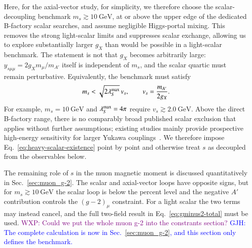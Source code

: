 \documentclass[onecolumn, aps, nofootinbib, prd, preprint, floats, floatfix, amsmath, amssymb, superscriptaddress, preprintnumbers]{revtex4-2}
\newcommand{\GJH}[1]{\textcolor{blue}{GJH: #1}}
\newcommand{\WXP}[1]{\textcolor{purple}{WXP: #1}}
\begin{document}
Here, for the axial-vector study, for simplicity, we therefore choose the scalar-decoupling benchmark $m_s\gtrsim10~\mathrm{GeV}$, at or above the upper edge of the dedicated B-factory scalar searches, and assume negligible Higgs-portal mixing. This removes the strong light-scalar limits and suppresses scalar exchange, allowing us to explore substantially larger $g_X$ than would be possible in a light-scalar benchmark. The statement is not that $g_X$ becomes arbitrarily large: $y_{s\mu\mu}=2g_Xm_\mu/m_{A'}$ itself is independent of $m_s$, and the scalar quartic must remain perturbative. Equivalently, the benchmark must satisfy
\begin{equation}
m_s<\sqrt{2\lambda_S^{\rm max}}\,v_s,
\qquad v_s=\frac{m_{A'}}{2g_X}.
\label{eq:heavy-scalar-existence}
\end{equation}
For example, $m_s=10~\mathrm{GeV}$ and $\lambda_S^{\rm max}=4\pi$ require $v_s\gtrsim2.0~\mathrm{GeV}$. Above the direct B-factory range, there is no comparably broad published scalar exclusion that applies without further assumptions; existing studies mainly provide prospective high-energy sensitivity for larger Yukawa couplings~\cite{Chen:2021leptophilic}. We therefore impose Eq.~\eqref{eq:heavy-scalar-existence} point by point and otherwise treat $s$ as decoupled from the observables below.

The remaining role of $s$ in the muon magnetic moment is discussed quantitatively in Sec.~\ref{sec:muon_g-2}. The scalar and axial-vector loops have opposite signs, but for $m_s\gtrsim10~\mathrm{GeV}$ the scalar loop is below the percent level and the negative $A'$ contribution controls the $(g-2)_\mu$ constraint. For a light scalar the two terms may instead cancel, and the full two-field result in Eq.~\eqref{eq:gminus2-total} must be used.
\WXP{Could we put the whole muon g-2 into the constrants section?}
\GJH{The complete calculation is now in Sec.~\ref{sec:muon_g-2}, and this section only defines the benchmark.}
\end{document}
